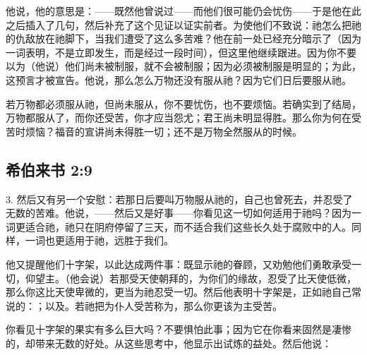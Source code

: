 他说，他的意思是：——既然他曾说过——而他们很可能仍会忧伤——于是他在此之后插入了几句，然后补充了这个见证以证实前者。为使他们不致说：祂怎么把祂的仇敌放在祂脚下，当我们遭受了这么多苦难？他在前一处已经充分暗示了（因为一词表明，不是立即发生，而是经过一段时间），但这里他继续跟进。因为你不要以为（他说）他们尚未被制服，就不会被制服；因为必须被制服是明显的；为此，这预言才被宣告。他说，那么怎么万物还没有服从祂？因为它们日后要服从祂。\par

若万物都必须服从祂，但尚未服从，你不要忧伤，也不要烦恼。若确实到了结局，万物都服从了，而你还受苦，你才应当怨尤；君王尚未明显得胜。那么你为何在受苦时烦恼？福音的宣讲尚未得胜一切；还不是万物全然服从的时候。\par


\subsection{希伯来书 2:9}

3. 然后又有另一个安慰：若那日后要叫万物服从祂的，自己也曾死去，并忍受了无数的苦难。他说，——然后又是好事——你看见这一切如何适用于祂吗？因为一词更适合祂，祂只在阴府停留了三天，而不适合我们这些长久处于腐败中的人。同样，一词也更适用于祂，远胜于我们。\par

他又提醒他们十字架，以此达成两件事：既显示祂的眷顾，又劝勉他们勇敢承受一切，仰望主。（他会说）若那受天使朝拜的，为你们的缘故，忍受了比天使低微，那么你这比天使卑微的，更当为祂忍受一切。然后他表明十字架是，正如祂自己常说的：；以及。若祂把为仆人受苦称为，那么你更该为主受苦。\par

你看见十字架的果实有多么巨大吗？不要惧怕此事；因为它在你看来固然是凄惨的，却带来无数的好处。从这些思考中，他显示出试炼的益处。然后他说：\par

